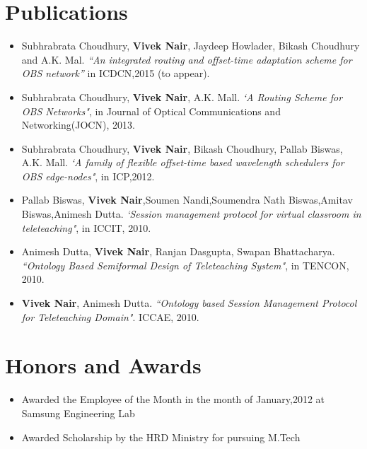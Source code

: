 \documentclass[margin,line]{res}
\begin{document}
\begin{resume}
\section{\sc Publications}
\begin{itemize}
\item Subhrabrata Choudhury, \textbf{Vivek Nair}, Jaydeep Howlader, Bikash Choudhury and A.K. Mal. \textit{``An integrated routing and offset-time adaptation scheme for OBS network''} in ICDCN,2015 (to appear).
\item Subhrabrata Choudhury, \textbf{Vivek Nair}, A.K. Mall. \textit{`A Routing Scheme for OBS Networks"}, in Journal of Optical Communications and Networking(JOCN), 2013.
\item Subhrabrata Choudhury, \textbf{Vivek Nair}, Bikash Choudhury, Pallab Biswas, A.K. Mall. \textit{`A family of flexible offset-time based wavelength schedulers for OBS edge-nodes"}, in ICP,2012.
\item Pallab Biswas, \textbf{Vivek Nair},Soumen Nandi,Soumendra Nath Biswas,Amitav Biswas,Animesh Dutta. \textit{`Session management protocol for virtual classroom in teleteaching"}, in ICCIT, 2010.
\item Animesh Dutta, \textbf{Vivek Nair}, Ranjan Dasgupta, Swapan Bhattacharya. \textit{``Ontology Based Semiformal Design of Teleteaching System"}, in TENCON, 2010.
\item \textbf{Vivek Nair}, Animesh Dutta. \textit{``Ontology based Session Management Protocol for Teleteaching Domain"}. ICCAE, 2010.
\end{itemize}

\section{\sc Honors and Awards} 
\begin{itemize}
    \item Awarded the Employee of the Month in the month of January,2012 at Samsung Engineering Lab
    \item Awarded Scholarship by the HRD Ministry for pursuing M.Tech
\end{itemize}


\end{resume}
\end{document}
